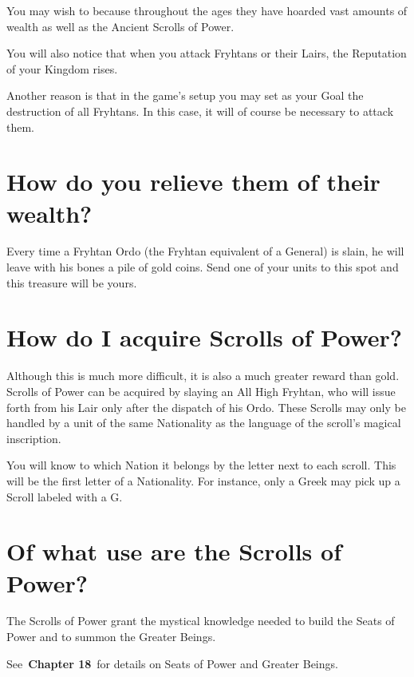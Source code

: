 You may wish to because throughout the ages they have hoarded vast amounts of wealth as well as the Ancient Scrolls of Power.

You will also notice that when you attack Fryhtans or their Lairs, the Reputation of your Kingdom rises.

Another reason is that in the game’s setup you may set as your Goal the destruction of all Fryhtans. In this case, it will of course be necessary to attack them.

\section{How do you relieve them of their wealth?}

Every time a Fryhtan Ordo (the Fryhtan equivalent of a General) is slain, he will leave with his bones a pile of gold coins. Send one of your units to this spot and this treasure will be yours.

\section{How do I acquire Scrolls of Power?}

Although this is much more difficult, it is also a much greater reward than gold. Scrolls of Power can be acquired by slaying an All High Fryhtan, who will issue forth from his Lair only after the dispatch of his Ordo. These Scrolls may only be handled by a unit of the same Nationality as the language of the scroll’s magical inscription.

You will know to which Nation it belongs by the letter next to each scroll. This will be the first letter of a Nationality. For instance, only a Greek may pick up a Scroll labeled with a G.

\section{Of what use are the Scrolls of Power?}

The Scrolls of Power grant the mystical knowledge needed to build the Seats of Power and to summon the Greater Beings.

See \textbf{Chapter 18} for details on Seats of Power and Greater Beings.